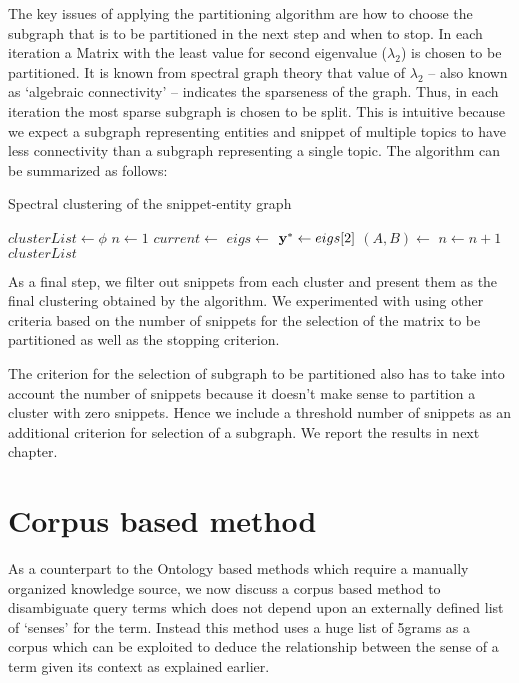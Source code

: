\documentclass[a4paper,12pt]{report}
\begin{document}
The key issues of applying the partitioning algorithm are how to choose
the subgraph that is to be partitioned in the next step and when to
stop. In each iteration a Matrix with the least value for second
eigenvalue ($\lambda_2$) is chosen to be partitioned. It is known from
spectral graph theory that value of $\lambda_2$ -- also known as
`algebraic connectivity' -- indicates the sparseness of the
graph. Thus, in each iteration the most sparse subgraph is chosen to
be split. This is intuitive because we expect a subgraph representing
entities and snippet of multiple topics to have less connectivity than
a subgraph representing a single topic. The algorithm can be
summarized as follows:
\begin{algorithm}
\caption{Spectral clustering of the snippet-entity graph}
\begin{algorithmic}
   \State $clusterList \gets \phi$
   \State {}
   \State $n \gets 1$ 
       \State $current \gets $ 
       \State $eigs \gets $ 
       \State ${\bf y}^* \gets eigs[2]$ 
       \State $(A,B) \gets $ 
       \State {}
       \State {}
       \State {}
       \State $n \gets n + 1$
   \EndWhile
   \State \Return $clusterList$
\EndFunction
\end{algorithmic}
\end{algorithm}

As a final step, we filter out snippets from each cluster and present
them as the final clustering obtained by the algorithm. We
experimented with using other criteria based on the number of snippets
for the selection of the matrix to be partitioned as well as the
stopping criterion. 

The criterion for the selection of subgraph to be partitioned also has
to take into account the number of snippets because it doesn't make
sense to partition a cluster with zero snippets. Hence we include a
threshold number of snippets as an additional criterion for selection
of a subgraph. We report the results in next chapter.
\section{Corpus based method}
As a counterpart to the Ontology based methods which require a
manually organized knowledge source, we now discuss a corpus based
method to disambiguate query terms which does not depend upon an
externally defined list of `senses' for the term. Instead this method
uses a huge list of 5grams as a corpus which can be exploited to
deduce the relationship between the sense of a term given its context
as explained earlier.
\end{document}
